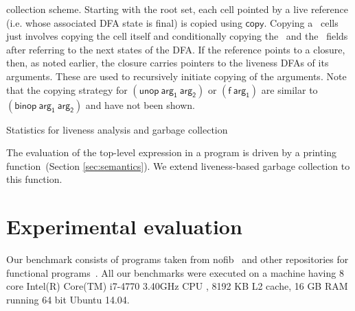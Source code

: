 \documentclass[preprint, 9pt]{sigplanconf}
\begin{document}
collection scheme.  Starting with the root set, each cell pointed by a
live reference  (i.e. whose associated  DFA state is final)  is copied
using $\mathsf{copy}$.   Copying a \CONS\ cells  just involves copying
the  cell  itself   and  conditionally  copying  the   \CAR\  and  the
\CDR\ fields after referring to the  next states of the DFA.  If
the reference points to a closure, then, as noted earlier, the closure
carries pointers  to the liveness  DFAs of its  arguments.  These
are  used to recursively  initiate copying of  the arguments.
Note that  the copying  strategy for  $\mathsf{(unop~arg_1~arg_2)}$ or
$\mathsf{(f~arg_1)}$ are similar to $\mathsf{(binop~arg_1~arg_2)}$ and
have not been shown.



\begin{table*}[t!]
\caption{Statistics for liveness analysis and garbage collection}
\label{tab:exp-results}
\centering


\vskip -5mm
\end{table*} 





The evaluation of  the top-level expression in a program  is driven by
a printing function~(Section
\ref{sec:semantics}).  
We extend liveness-based  garbage  collection  to
this function.

\section{Experimental evaluation}
\label{sec:experiments}
  Our benchmark consists of programs taken from nofib~\cite{nofib} and
  other repositories for  functional  programs~\cite{PLT-Scheme,
    gc_bench, huffman-sicp}.   All our  benchmarks were executed  on a
  machine having 8  core Intel(R) Core(TM) i7-4770 3.40GHz  CPU , 8192
  KB L2 cache, 16 GB RAM running 64 bit Ubuntu 14.04.
\end{document}
